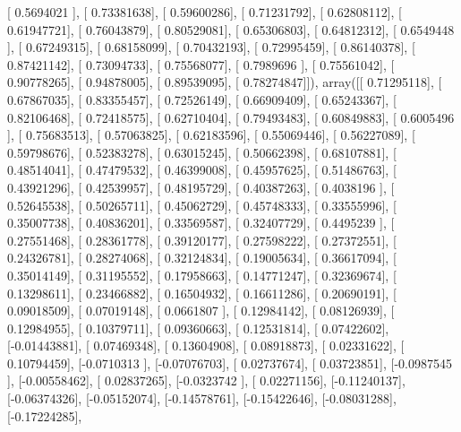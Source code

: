 \documentclass{article}
\begin{document}
       [ 0.5694021 ],
       [ 0.73381638],
       [ 0.59600286],
       [ 0.71231792],
       [ 0.62808112],
       [ 0.61947721],
       [ 0.76043879],
       [ 0.80529081],
       [ 0.65306803],
       [ 0.64812312],
       [ 0.6549448 ],
       [ 0.67249315],
       [ 0.68158099],
       [ 0.70432193],
       [ 0.72995459],
       [ 0.86140378],
       [ 0.87421142],
       [ 0.73094733],
       [ 0.75568077],
       [ 0.7989696 ],
       [ 0.75561042],
       [ 0.90778265],
       [ 0.94878005],
       [ 0.89539095],
       [ 0.78274847]]), array([[ 0.71295118],
       [ 0.67867035],
       [ 0.83355457],
       [ 0.72526149],
       [ 0.66909409],
       [ 0.65243367],
       [ 0.82106468],
       [ 0.72418575],
       [ 0.62710404],
       [ 0.79493483],
       [ 0.60849883],
       [ 0.6005496 ],
       [ 0.75683513],
       [ 0.57063825],
       [ 0.62183596],
       [ 0.55069446],
       [ 0.56227089],
       [ 0.59798676],
       [ 0.52383278],
       [ 0.63015245],
       [ 0.50662398],
       [ 0.68107881],
       [ 0.48514041],
       [ 0.47479532],
       [ 0.46399008],
       [ 0.45957625],
       [ 0.51486763],
       [ 0.43921296],
       [ 0.42539957],
       [ 0.48195729],
       [ 0.40387263],
       [ 0.4038196 ],
       [ 0.52645538],
       [ 0.50265711],
       [ 0.45062729],
       [ 0.45748333],
       [ 0.33555996],
       [ 0.35007738],
       [ 0.40836201],
       [ 0.33569587],
       [ 0.32407729],
       [ 0.4495239 ],
       [ 0.27551468],
       [ 0.28361778],
       [ 0.39120177],
       [ 0.27598222],
       [ 0.27372551],
       [ 0.24326781],
       [ 0.28274068],
       [ 0.32124834],
       [ 0.19005634],
       [ 0.36617094],
       [ 0.35014149],
       [ 0.31195552],
       [ 0.17958663],
       [ 0.14771247],
       [ 0.32369674],
       [ 0.13298611],
       [ 0.23466882],
       [ 0.16504932],
       [ 0.16611286],
       [ 0.20690191],
       [ 0.09018509],
       [ 0.07019148],
       [ 0.0661807 ],
       [ 0.12984142],
       [ 0.08126939],
       [ 0.12984955],
       [ 0.10379711],
       [ 0.09360663],
       [ 0.12531814],
       [ 0.07422602],
       [-0.01443881],
       [ 0.07469348],
       [ 0.13604908],
       [ 0.08918873],
       [ 0.02331622],
       [ 0.10794459],
       [-0.0710313 ],
       [-0.07076703],
       [ 0.02737674],
       [ 0.03723851],
       [-0.0987545 ],
       [-0.00558462],
       [ 0.02837265],
       [-0.0323742 ],
       [ 0.02271156],
       [-0.11240137],
       [-0.06374326],
       [-0.05152074],
       [-0.14578761],
       [-0.15422646],
       [-0.08031288],
       [-0.17224285],
\end{document}
